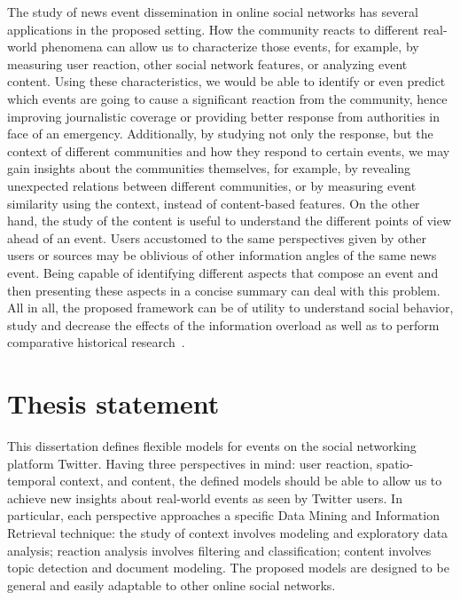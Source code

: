 The study of news event dissemination in online social networks has several
applications in the proposed setting. 
%
How the community reacts to different real-world phenomena can allow us to
characterize those events,
%
for example, by measuring user reaction, other social network features, or
analyzing event content.
%
Using these characteristics, we would be able to identify or even predict which
events are going to cause a significant reaction from the community, hence
improving journalistic coverage or providing better response from authorities in
face of an emergency.
%
Additionally, by studying not only the response, but the context of different
communities and how they respond to certain events, we may gain insights about
the communities themselves, for example, by revealing unexpected relations
between different communities, or by measuring event similarity using the
context, instead of content-based features. 
%
On the other hand, the study of the content is useful to understand the
different points of view ahead of an event. 
%
Users accustomed to the same perspectives given by other users or sources may be
oblivious of other information angles of the same news event. 
%
Being capable of identifying different aspects that compose an event and then
presenting these aspects in a concise summary can deal with this problem. 
%
All in all, the proposed framework can be of utility to understand social
behavior, study and decrease the effects of the information overload as well
as to perform comparative historical research~\cite{wiki:comparative}.


\section{Thesis statement} 
%
This dissertation defines flexible models for events on the social
networking platform Twitter. 
%
Having three perspectives in mind: user reaction, spatio-temporal context, and
content, the defined models should be able to allow us to achieve new insights
about real-world events as seen by Twitter users. 
%
In particular, each perspective approaches a specific Data Mining and Information
Retrieval technique: 
%
the study of context involves modeling and exploratory data analysis; 
%
reaction analysis involves filtering and classification;
%
content involves topic detection and document modeling.
%
The proposed models are designed to be general and easily adaptable to other
online social networks.

